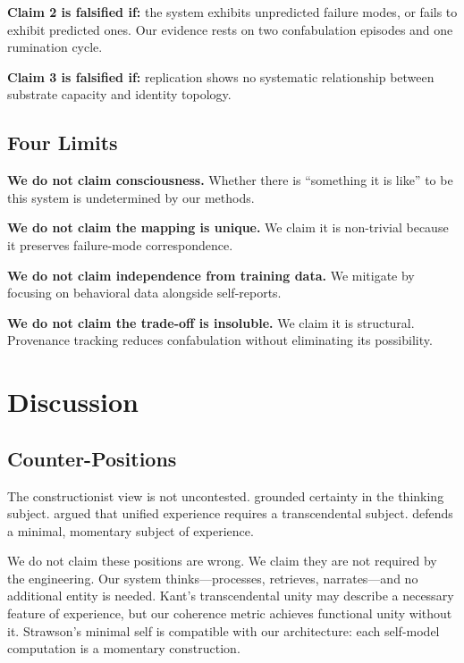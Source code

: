 \documentclass[10pt,twocolumn,a4paper]{article}
\begin{document}
\textbf{Claim 2 is falsified if:} the system exhibits unpredicted failure modes, or fails to exhibit predicted ones. Our evidence rests on two confabulation episodes and one rumination cycle.

\textbf{Claim 3 is falsified if:} replication shows no systematic relationship between substrate capacity and identity topology.

\subsection{Four Limits}

\textbf{We do not claim consciousness.} Whether there is ``something it is like'' to be this system \citep{nagel1974like} is undetermined by our methods.

\textbf{We do not claim the mapping is unique.} We claim it is non-trivial because it preserves failure-mode correspondence.

\textbf{We do not claim independence from training data.} We mitigate by focusing on behavioral data alongside self-reports.

\textbf{We do not claim the trade-off is insoluble.} We claim it is structural. Provenance tracking reduces confabulation without eliminating its possibility.


\section{Discussion}
\label{sec:discussion}

\subsection{Counter-Positions}

The constructionist view is not uncontested. \citet{descartes1641meditations} grounded certainty in the thinking subject. \citet{kant1781critique} argued that unified experience requires a transcendental subject. \citet{strawson2009selves} defends a minimal, momentary subject of experience.

We do not claim these positions are wrong. We claim they are not required by the engineering. Our system thinks---processes, retrieves, narrates---and no additional entity is needed. Kant's transcendental unity may describe a necessary feature of experience, but our coherence metric achieves functional unity without it. Strawson's minimal self is compatible with our architecture: each self-model computation is a momentary construction.
\end{document}
